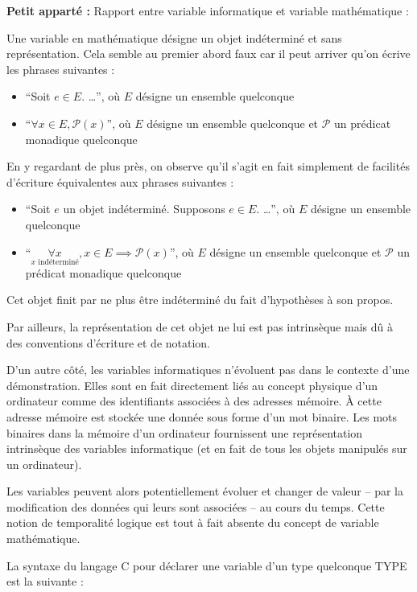 \documentclass[../../../main.tex]{subfiles}
\begin{document}
\begin{minitelbasicbox}{\textbf{Petit apparté :} Rapport entre variable informatique et variable mathématique :}

Une variable en mathématique désigne un objet indéterminé et sans représentation. Cela semble au premier abord faux car il peut arriver qu'on écrive les phrases suivantes :
\begin{itemize}
	\item ``Soit $e\in{E}$. \dots'', où $E$ désigne un ensemble quelconque
	\item ``$\forall{x\in{E}}, \mathcal{P}(x)$'', où $E$ désigne un ensemble quelconque et $\mathcal{P}$ un prédicat monadique quelconque
\end{itemize}
En y regardant de plus près, on observe qu'il s'agit en fait simplement de facilités d'écriture équivalentes aux phrases suivantes :
\begin{itemize}
	\item ``Soit $e$ un objet indéterminé. Supposons $e\in{E}$. \dots'', où $E$ désigne un ensemble quelconque
	\item ``$\underset{x \text{ indéterminé}}{\forall{x}}, x\in{E}\implies{\mathcal{P}(x)}$'', où $E$ désigne un ensemble quelconque et $\mathcal{P}$ un prédicat monadique quelconque
\end{itemize}
Cet objet finit par ne plus être indéterminé du fait d'hypothèses à son propos.

Par ailleurs, la représentation de cet objet ne lui est pas intrinsèque mais dû à des conventions d'écriture et de notation.
 
D'un autre côté, les variables informatiques n'évoluent pas dans le contexte d'une démonstration. Elles sont en fait directement liés au concept physique d'un ordinateur comme des identifiants associées à des adresses mémoire. À cette adresse mémoire est stockée une donnée sous forme d'un mot binaire. Les mots binaires dans la mémoire d'un ordinateur fournissent une représentation intrinsèque des variables informatique (et en fait de tous les objets manipulés sur un ordinateur).

Les variables peuvent alors potentiellement évoluer et changer de valeur -- par la modification des données qui leurs sont associées -- au cours du temps. Cette notion de temporalité logique est tout à fait absente du concept de variable mathématique.
\end{minitelbasicbox}
La syntaxe du langage C pour déclarer une variable d'un type quelconque \textsf{TYPE} est la suivante :
\end{document}
